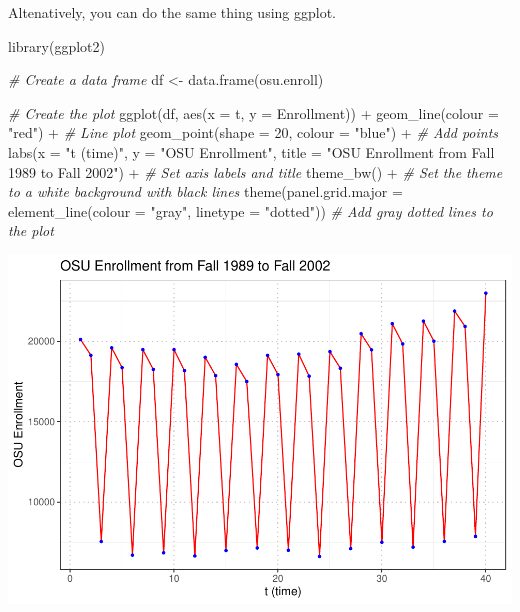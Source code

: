 \documentclass[
]{book}
\newenvironment{Shaded}{\begin{snugshade}}{\end{snugshade}}
\newcommand{\AttributeTok}[1]{\textcolor[rgb]{0.77,0.63,0.00}{#1}}
\newcommand{\CommentTok}[1]{\textcolor[rgb]{0.56,0.35,0.01}{\textit{#1}}}
\newcommand{\DecValTok}[1]{\textcolor[rgb]{0.00,0.00,0.81}{#1}}
\newcommand{\FunctionTok}[1]{\textcolor[rgb]{0.00,0.00,0.00}{#1}}
\newcommand{\NormalTok}[1]{#1}
\newcommand{\OtherTok}[1]{\textcolor[rgb]{0.56,0.35,0.01}{#1}}
\newcommand{\SpecialCharTok}[1]{\textcolor[rgb]{0.00,0.00,0.00}{#1}}
\newcommand{\StringTok}[1]{\textcolor[rgb]{0.31,0.60,0.02}{#1}}
\begin{document}
Altenatively, you can do the same thing using ggplot.

\begin{Shaded}
\begin{Highlighting}[]
\FunctionTok{library}\NormalTok{(ggplot2)}

\CommentTok{\# Create a data frame}
\NormalTok{df }\OtherTok{\textless{}{-}} \FunctionTok{data.frame}\NormalTok{(osu.enroll)}

\CommentTok{\# Create the plot}
\FunctionTok{ggplot}\NormalTok{(df, }\FunctionTok{aes}\NormalTok{(}\AttributeTok{x =}\NormalTok{ t, }\AttributeTok{y =}\NormalTok{ Enrollment)) }\SpecialCharTok{+}
  \FunctionTok{geom\_line}\NormalTok{(}\AttributeTok{colour =} \StringTok{"red"}\NormalTok{) }\SpecialCharTok{+}  \CommentTok{\# Line plot}
  \FunctionTok{geom\_point}\NormalTok{(}\AttributeTok{shape =} \DecValTok{20}\NormalTok{, }\AttributeTok{colour =} \StringTok{"blue"}\NormalTok{) }\SpecialCharTok{+}  \CommentTok{\# Add points}
  \FunctionTok{labs}\NormalTok{(}\AttributeTok{x =} \StringTok{"t (time)"}\NormalTok{, }\AttributeTok{y =} \StringTok{"OSU Enrollment"}\NormalTok{, }
       \AttributeTok{title =} \StringTok{"OSU Enrollment from Fall 1989 to Fall 2002"}\NormalTok{) }\SpecialCharTok{+}  \CommentTok{\# Set axis labels and title}
  \FunctionTok{theme\_bw}\NormalTok{() }\SpecialCharTok{+}  \CommentTok{\# Set the theme to a white background with black lines}
  \FunctionTok{theme}\NormalTok{(}\AttributeTok{panel.grid.major =} \FunctionTok{element\_line}\NormalTok{(}\AttributeTok{colour =} \StringTok{"gray"}\NormalTok{, }\AttributeTok{linetype =} \StringTok{"dotted"}\NormalTok{))  }\CommentTok{\# Add gray dotted lines to the plot}
\end{Highlighting}
\end{Shaded}

\includegraphics{02-Time-Series-Basics_files/figure-latex/unnamed-chunk-7-1.pdf}
\end{document}
